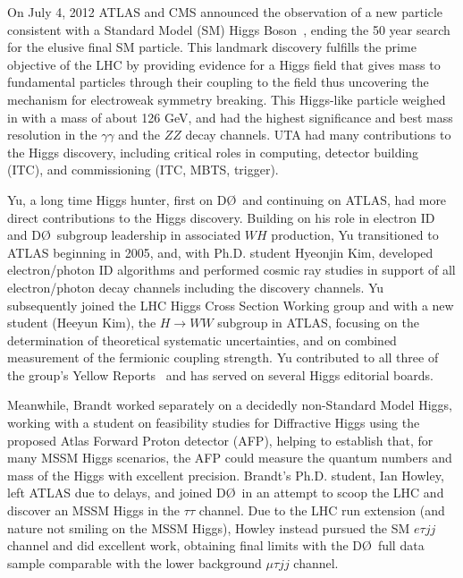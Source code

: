 On July 4, 2012 ATLAS and CMS announced the observation of a new particle consistent with a Standard Model (SM) Higgs Boson~\cite{ATLAS-Higgs-Observation, CMS-Higgs-Observation}, ending the 50 year search for the elusive final SM particle. This landmark discovery fulfills the prime objective of the LHC by providing evidence for a Higgs field that gives mass to fundamental particles through their coupling to the field thus uncovering the mechanism for  electroweak symmetry breaking.
This Higgs-like particle weighed in with a mass of about 126 GeV, and had the highest significance
and best mass resolution  in the $\gamma\gamma$ and the $ZZ$ decay channels.
UTA had many contributions to the Higgs discovery, including critical roles in computing,
detector building (ITC), and commissioning (ITC, MBTS, trigger).

Yu, a long time Higgs hunter, first on D\O\ and
continuing on ATLAS, had more direct contributions to the Higgs discovery.
Building on his role in electron ID and D\O\ subgroup leadership in associated $WH$ production,
Yu transitioned to ATLAS beginning in 2005, and, with Ph.D. student
Hyeonjin Kim, developed electron/photon ID algorithms and performed cosmic ray studies in support of
all electron/photon decay channels including the discovery channels.
Yu subsequently joined the LHC Higgs Cross Section Working group and with a new student (Heeyun Kim),
the $H\rightarrow WW$ subgroup in ATLAS, focusing on the determination of theoretical
systematic uncertainties, and on combined measurement of the fermionic coupling strength.
Yu contributed to all three of the group's Yellow Reports~\cite{higgs:YR1, higgs:YR2, higgs:YR3}
and has served on several Higgs editorial boards.

Meanwhile, Brandt worked separately on a decidedly non-Standard Model Higgs, working with a student on
feasibility studies for Diffractive Higgs using the proposed Atlas Forward Proton detector (AFP),
helping to establish that, for many MSSM Higgs scenarios, the AFP could measure the quantum numbers and
mass of the Higgs with excellent precision. Brandt's Ph.D. student, Ian Howley, left ATLAS due to delays, and  joined D\O\ in an attempt to scoop the LHC and discover
an MSSM Higgs in the $\tau\tau$ channel.
Due to the LHC run extension (and nature not smiling on the MSSM Higgs), Howley instead pursued the SM $e\tau j j$ channel and did excellent work, obtaining final limits with the D\O\ full data sample comparable with the lower background $\mu\tau j j$ channel.

